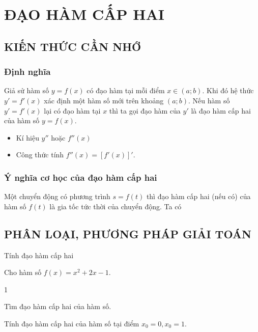 \setcounter{dang}{0}
\section{ĐẠO HÀM CẤP HAI}
\subsection{KIẾN THỨC CẦN NHỚ}
\subsubsection{Định nghĩa}
	Giả sử hàm số $y = f(x)$ có đạo hàm tại mỗi điểm $x \in (a; b)$. Khi đó hệ thức $y'= f'(x)$ xác định một hàm số mới trên khoảng $(a; b)$. Nếu hàm số $y' = f'(x)$ lại có đạo hàm tại $x$ thì ta gọi đạo hàm của $y'$ là đạo hàm cấp hai của hàm số $y = f(x)$.
	\begin{note}
	\begin{itemize}
		\item [$\bullet$] Kí hiệu $y''$ hoặc $f''(x)$
		\item [$\bullet$] Công thức tính $f''(x)=[f'(x)]'$.
	\end{itemize}
\end{note}
\subsubsection{Ý nghĩa cơ học của đạo hàm cấp hai}
	Một chuyển động có phương trình $s=f(t)$ thì đạo hàm cấp hai (nếu có) của hàm số $f(t)$ là gia tốc tức thời của chuyển động. Ta có 
\subsection{PHÂN LOẠI, PHƯƠNG PHÁP GIẢI TOÁN}

\begin{dang}{Tính đạo hàm cấp hai}
\end{dang}

\begin{vd}%
	Cho hàm số $f(x)=x^2+2 x-1$.
	\begin{enumEX}{1}
		\item Tìm đạo hàm cấp hai của hàm số.
		\item Tính đạo hàm cấp hai của hàm số tại điểm $x_0=0, x_0=1$.
	\end{enumEX}
\end{vd} 

